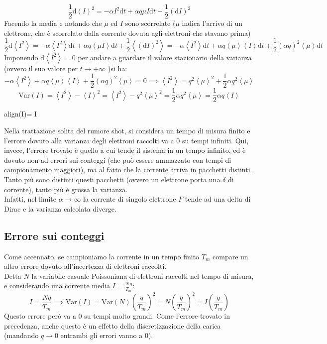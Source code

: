 \documentclass[a4paper,12pt]{article}
\newcommand{\boxedeq}[2]{\begin{empheq}[box={\fboxsep=6pt\fbox}]{align}\label{#1}#2\end{empheq}}
\theoremstyle{plain}
\theoremstyle{definition}
\newcommand{\f}[2]{\frac{#1}{#2}}
\newcommand{\ave}[1]{\left\langle#1\right\rangle }
\newcommand{\Var}{\mathrm{Var}}
\renewcommand{\d}{\text{d}}
\theoremstyle{remark}
\begin{document}
\[ \f{1}{2}\d (I)^2=-\alpha {I^2} \d t+\alpha q {\mu I}\d t+\f{1}{2}(\d I)^2	\]
Facendo la media e notando che $\mu$ ed $I$ sono scorrelate ($\mu$ indica l'arrivo di un elettrone, che è scorrelato dalla corrente dovuta agli elettroni che stavano prima)
\[\f{1}{2} \d \ave{I^2}=-\alpha \ave{I^2} \d t+\alpha q \ave{\mu I}\d t+\f{1}{2}\ave{(\d I)^2}=-\alpha \ave{I^2} \d t+\alpha q \ave{\mu} \ave{I}\d t	+\f{1}{2}\left(	\alpha q\right)^2	\ave{\mu} \d t\]
Imponendo $ \d \ave{I^2}=0$ per andare a guardare il valore stazionario della varianza (ovvero il suo valore per $t\rightarrow+\infty$ )si ha:
\[-\alpha \ave{I^2} +\alpha q \ave{\mu} \ave{I}	+\f{1}{2}\left(	\alpha q\right)^2	\ave{\mu} =0\implies \ave{I^2} = q^2 \ave{\mu} ^2	+\f{1}{2}\alpha	 q^2	\ave{\mu} \]
\[\Var(I)=\ave{I^2}-\ave{I}^2=\ave{I^2}-q^2\ave{\mu}^2=\f{1}{2}\alpha	 q^2	\ave{\mu}=\f{1}{2}{\alpha}{q}	\ave{I}\]
\boxedeq{shot1}{\Var(I)=\f{1}{2}{\alpha}{q}	\ave{I}}
Nella trattazione solita del rumore shot, si considera un tempo di misura finito e l'errore dovuto alla varianza degli elettroni raccolti va a $0$ su tempi infiniti. Qui, invece, l'errore trovato è quello a cui tende il sistema in un tempo infinito, ed è dovuto non ad errori sui conteggi (che può essere ammazzato con tempi di campionamento maggiori), ma al fatto che la corrente arriva in pacchetti distinti. \\Tanto più sono distinti questi pacchetti (ovvero un elettrone porta una $\delta$ di corrente), tanto più è grossa la varianza.
\\Infatti, nel limite $\alpha\rightarrow\infty$ la corrente di singolo elettrone $F$ tende ad una delta di Dirac e la varianza calcolata diverge.
\subsection{Errore sui conteggi}
Come accennato, se campioniamo la corrente in un tempo finito $T_m$ compare un altro errore dovuto all'incertezza di elettroni raccolti.\\ Detta $N$ la variabile casuale Poissoniana di elettroni raccolti nel tempo di misura, e considerando una corrente media $I=\f{N \,q}{T_m}$:
\[I=\f{N q}{T_m}\implies\Var (I)=\Var(N)\left(\f{q}{T_m}\right)^2=N\left(\f{q}{T_m}\right)^2=I\left(\f{q}{T_m}\right)	\]
Questo errore però va a $0$ su tempi molto grandi. Come l'errore trovato in precedenza, anche questo è un effetto della discretizzazione della carica (mandando $q\rightarrow0$ entrambi gli errori vanno a 0).
\end{document}
